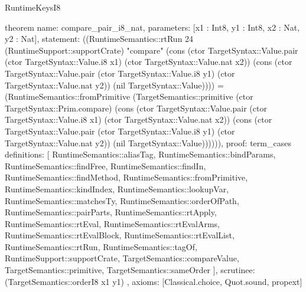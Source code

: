 \begin{lexlean}{RuntimeKeysI8}
\begin{semanticmodule}
theorem{
  name: compare_pair_i8_nat,
  parameters: [x1 : Int8, y1 : Int8, x2 : Nat, y2 : Nat],
  statement: ((RuntimeSemantics::rtRun 24 (RuntimeSupport::supportCrate) "compare" (cons (ctor TargetSyntax::Value.pair (ctor TargetSyntax::Value.i8 x1) (ctor TargetSyntax::Value.nat x2)) (cons (ctor TargetSyntax::Value.pair (ctor TargetSyntax::Value.i8 y1) (ctor TargetSyntax::Value.nat y2)) (nil TargetSyntax::Value)))) = (RuntimeSemantics::fromPrimitive (TargetSemantics::primitive (ctor TargetSyntax::Prim.compare) (cons (ctor TargetSyntax::Value.pair (ctor TargetSyntax::Value.i8 x1) (ctor TargetSyntax::Value.nat x2)) (cons (ctor TargetSyntax::Value.pair (ctor TargetSyntax::Value.i8 y1) (ctor TargetSyntax::Value.nat y2)) (nil TargetSyntax::Value)))))),
  proof: term_cases{
    definitions: [
      RuntimeSemantics::aliasTag,
      RuntimeSemantics::bindParams,
      RuntimeSemantics::findFree,
      RuntimeSemantics::findIn,
      RuntimeSemantics::findMethod,
      RuntimeSemantics::fromPrimitive,
      RuntimeSemantics::kindIndex,
      RuntimeSemantics::lookupVar,
      RuntimeSemantics::matchesTy,
      RuntimeSemantics::orderOfPath,
      RuntimeSemantics::pairParts,
      RuntimeSemantics::rtApply,
      RuntimeSemantics::rtEval,
      RuntimeSemantics::rtEvalArms,
      RuntimeSemantics::rtEvalBlock,
      RuntimeSemantics::rtEvalList,
      RuntimeSemantics::rtRun,
      RuntimeSemantics::tagOf,
      RuntimeSupport::supportCrate,
      TargetSemantics::compareValue,
      TargetSemantics::primitive,
      TargetSemantics::sameOrder
    ],
    scrutinee: (TargetSemantics::orderI8 x1 y1)
  },
  axioms: [Classical.choice, Quot.sound, propext]
}


\end{semanticmodule}
\end{lexlean}
